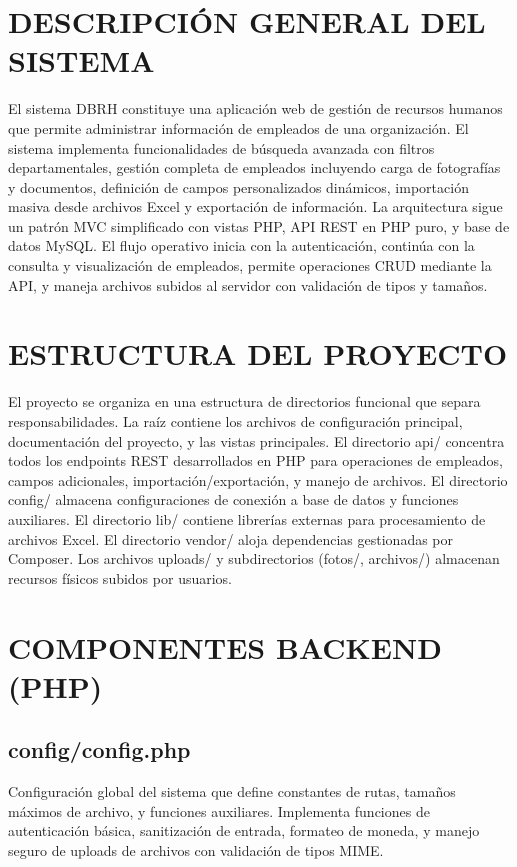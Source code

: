 \documentclass[12pt,a4paper]{article}
\begin{document}
\section{DESCRIPCIÓN GENERAL DEL SISTEMA}
El sistema DBRH constituye una aplicación web de gestión de recursos humanos que permite administrar información de empleados de una organización. El sistema implementa funcionalidades de búsqueda avanzada con filtros departamentales, gestión completa de empleados incluyendo carga de fotografías y documentos, definición de campos personalizados dinámicos, importación masiva desde archivos Excel y exportación de información. La arquitectura sigue un patrón MVC simplificado con vistas PHP, API REST en PHP puro, y base de datos MySQL. El flujo operativo inicia con la autenticación, continúa con la consulta y visualización de empleados, permite operaciones CRUD mediante la API, y maneja archivos subidos al servidor con validación de tipos y tamaños.

\section{ESTRUCTURA DEL PROYECTO}
El proyecto se organiza en una estructura de directorios funcional que separa responsabilidades. La raíz contiene los archivos de configuración principal, documentación del proyecto, y las vistas principales. El directorio api/ concentra todos los endpoints REST desarrollados en PHP para operaciones de empleados, campos adicionales, importación/exportación, y manejo de archivos. El directorio config/ almacena configuraciones de conexión a base de datos y funciones auxiliares. El directorio lib/ contiene librerías externas para procesamiento de archivos Excel. El directorio vendor/ aloja dependencias gestionadas por Composer. Los archivos uploads/ y subdirectorios (fotos/, archivos/) almacenan recursos físicos subidos por usuarios.

\section{COMPONENTES BACKEND (PHP)}

\subsection{config/config.php}
Configuración global del sistema que define constantes de rutas, tamaños máximos de archivo, y funciones auxiliares. Implementa funciones de autenticación básica, sanitización de entrada, formateo de moneda, y manejo seguro de uploads de archivos con validación de tipos MIME.
\end{document}

